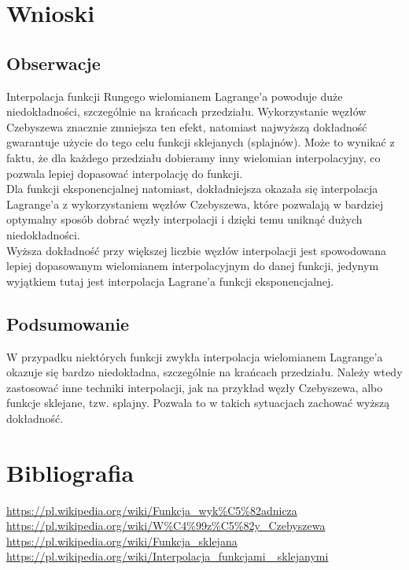 \documentclass[11pt]{scrartcl}
\begin{document}
    \section{Wnioski}
    \subsection{Obserwacje}
    Interpolacja funkcji Rungego wielomianem Lagrange'a powoduje
    duże niedokładności, szczególnie na krańcach przedziału.
    Wykorzystanie węzłów Czebyszewa znacznie zmniejsza ten efekt,
    natomiast najwyższą dokładność gwarantuje użycie do tego celu
    funkcji sklejanych (splajnów). Może to wynikać z faktu, że
    dla każdego przedziału dobieramy inny wielomian interpolacyjny,
    co pozwala lepiej dopasować interpolację do funkcji. \\
    Dla funkcji eksponencjalnej natomiast, dokładniejsza okazała
    się interpolacja Lagrange'a z wykorzystaniem węzłów Czebyszewa,
    które pozwalają w bardziej optymalny sposób dobrać węzły
    interpolacji i dzięki temu uniknąć dużych niedokładności. \\
    Wyższa dokładność przy większej liczbie węzłów interpolacji
    jest spowodowana lepiej dopasowanym wielomianem interpolacyjnym
    do danej funkcji, jedynym wyjątkiem tutaj jest interpolacja
    Lagrane'a funkcji eksponencjalnej.

    \subsection{Podsumowanie}
    W przypadku niektórych funkcji zwykła interpolacja wielomianem
    Lagrange'a okazuje się bardzo niedokładna, szczególnie na
    krańcach przedziału. Należy wtedy zastosować inne techniki
    interpolacji, jak na przykład węzły Czebyszewa, albo funkcje
    sklejane, tzw. splajny. Pozwala to w takich sytuacjach zachować
    wyższą dokładność.

    \section{Bibliografia}
    \url{https://pl.wikipedia.org/wiki/Funkcja_wyk%C5%82adnicza} \\
    \url{https://pl.wikipedia.org/wiki/W%C4%99z%C5%82y_Czebyszewa} \\
    \url{https://pl.wikipedia.org/wiki/Funkcja_sklejana} \\
    \url{https://pl.wikipedia.org/wiki/Interpolacja_funkcjami_
        sklejanymi}
\end{document}
